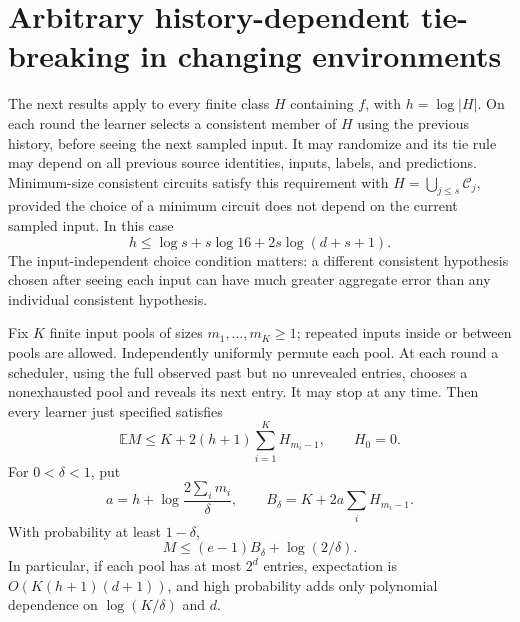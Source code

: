 \section{Arbitrary history-dependent tie-breaking in changing environments}

The next results apply to every finite class $H$ containing $f$, with
$h=\log|H|$. On each round the learner selects a consistent member of $H$
using the previous history, before seeing the next sampled input. It may
randomize and its tie rule may depend on all previous source identities,
inputs, labels, and predictions. Minimum-size consistent circuits satisfy
this requirement with
$H=\bigcup_{j\le s}\mathcal C_j$, provided the choice of a minimum circuit
does not depend on the current sampled input. In this case
\[
 h\le\log s+s\log16+2s\log(d+s+1).
\]
The input-independent choice condition matters: a different consistent
hypothesis chosen after seeing each input can have much greater aggregate
error than any individual consistent hypothesis.

\begin{theorem}\label{thm:random-pools}
Fix $K$ finite input pools of sizes $m_1,\ldots,m_K\ge1$; repeated inputs
inside or between pools are allowed. Independently uniformly permute each
pool. At each round a scheduler, using the full observed past but no
unrevealed entries, chooses a nonexhausted pool and reveals its next
entry. It may stop at any time. Then every learner just specified satisfies
\[
 \mathbb E M\le K+2(h+1)\sum_{i=1}^K H_{m_i-1},
 \qquad H_0=0.
\]
For $0<\delta<1$, put
\[
 a=h+\log\frac{2\sum_i m_i}{\delta},\qquad
 B_\delta=K+2a\sum_i H_{m_i-1}.
\]
With probability at least $1-\delta$,
\[
 M\le(e-1)B_\delta+\log(2/\delta).
\]
In particular, if each pool has at most $2^d$ entries, expectation is
$O(K(h+1)(d+1))$, and high probability adds only polynomial dependence on
$\log(K/\delta)$ and $d$.
\end{theorem}

